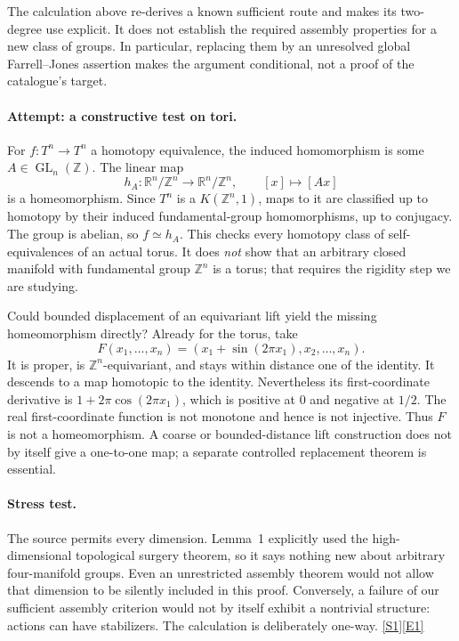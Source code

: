 \documentclass[11pt,a4paper]{article}
\newcommand{\Z}{\mathbb{Z}}
\newcommand{\R}{\mathbb{R}}
\newcommand{\sref}[2]{\hyperlink{source:#1:#2}{[S#2]}}
\newcommand{\eref}[2]{\hyperlink{extra:#1:#2}{[E#2]}}
\numberwithin{equation}{section}
\begin{document}
The calculation above re-derives a known sufficient route and makes its
two-degree use explicit. It does not establish the required assembly
properties for a new class of groups. In particular, replacing them by
an unresolved global Farrell--Jones assertion makes the argument
conditional, not a proof of the catalogue's target.

\paragraph{Attempt: a constructive test on tori.}
For $f:T^n\to T^n$ a homotopy equivalence, the induced homomorphism is
some $A\in\operatorname{GL}_n(\Z)$. The linear map
\[
 h_A:\R^n/\Z^n\longrightarrow\R^n/\Z^n,
 \qquad [x]\longmapsto[Ax]
\]
is a homeomorphism. Since $T^n$ is a $K(\Z^n,1)$, maps to it are
classified up to homotopy by their induced fundamental-group homomorphisms,
up to conjugacy. The group is abelian, so $f\simeq h_A$.
This checks every homotopy class of self-equivalences of an actual torus.
It does \emph{not} show that an arbitrary closed manifold with fundamental
group $\Z^n$ is a torus; that requires the rigidity step we are studying.

Could bounded displacement of an equivariant lift yield the missing
homeomorphism directly? Already for the torus, take
\[
 F(x_1,\ldots,x_n)=
 (x_1+\sin(2\pi x_1),x_2,\ldots,x_n).
\]
It is proper, is $\Z^n$-equivariant, and stays within distance one of the
identity. It descends to a map homotopic to the identity. Nevertheless its
first-coordinate derivative is $1+2\pi\cos(2\pi x_1)$, which is positive
at $0$ and negative at $1/2$. The real first-coordinate function is not
monotone and hence is not injective. Thus $F$ is not a homeomorphism.
A coarse or bounded-distance lift construction does not by itself give
a one-to-one map; a separate controlled replacement theorem is essential.

\paragraph{Stress test.}
The source permits every dimension. Lemma~1 explicitly used the
high-dimensional topological surgery theorem, so it says nothing new about
arbitrary four-manifold groups. Even an unrestricted assembly theorem
would not allow that dimension to be silently included in this proof.
Conversely, a failure of our sufficient assembly criterion would not by
itself exhibit a nontrivial structure: actions can have stabilizers.
The calculation is deliberately one-way. \sref{30006734}{1}\eref{30006734}{1}
\end{document}
